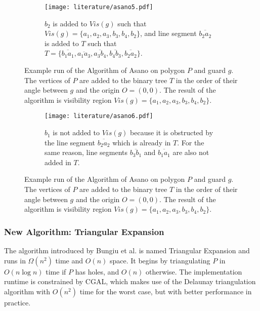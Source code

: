 \begin{figure}[h!]
\begin{subfigure}{0.45\textwidth}
		\texttt{[image: literature/asano5.pdf]}
		\caption{$b_2$ is added to $\mathit{Vis}(g)$ such that \\ $\mathit{Vis}(g) = \{a_1, a_2, a_3, b_3, b_4, b_2\}$, and line segment $\overline{b_2a_2}$ is added to $T$ such that \\ $T = \{\overline{b_1a_1}, \overline{a_1a_3}, \overline{a_3b_4}, \overline{b_4b_3}, \overline{b_2a_2}\}$.}
	\end{subfigure}
	\caption{Example run of the Algorithm of Asano \cite{asano1985efficient} on polygon $P$ and guard $g$. The vertices of $P$ are added to the binary tree $T$ in the order of their angle between $g$ and the origin $O = (0, 0)$. The result of the algorithm is visibility region $\mathit{Vis}(g) = \{a_1, a_2, a_3, b_3, b_4, b_2\}$.}
	\label{fig:asano_1}
\end{figure}
\begin{figure}[h!]
	\ContinuedFloat
	\centering

	\begin{subfigure}{\textwidth}
		\centering
		\texttt{[image: literature/asano6.pdf]}
		\caption{$b_1$ is not added to $\mathit{Vis}(g)$ because it is obstructed by the line segment $\overline{b_2a_2}$ which is already in $T$. For the same reason, line segments $\overline{b_3b_1}$ and $\overline{b_1a_1}$ are also not added in $T$.}
		\label{fig:asano7}
	\end{subfigure}
	\caption{Example run of the Algorithm of Asano \cite{asano1985efficient} on polygon $P$ and guard $g$. The vertices of $P$ are added to the binary tree $T$ in the order of their angle between $g$ and the origin $O = (0, 0)$. The result of the algorithm is visibility region $\mathit{Vis}(g) = \{a_1, a_2, a_3, b_3, b_4, b_2\}$.}
	\label{fig:asano_2}
\end{figure}



\newpage 
\subsubsection{New Algorithm: Triangular Expansion}
The algorithm introduced by Bungiu et al. \cite{DBLP:journals/corr/BungiuHHHK14} is named Triangular Expansion and runs in $\Omega(n^2)$ time and $O(n)$ space. It begins by triangulating $P$ in $O(n \log n)$ time if $P$ has holes, and $O(n)$ otherwise. The implementation runtime is constrained by CGAL, which makes use of the Delaunay triangulation algorithm \cite{delaunay1934sphere} with $O(n^2)$ time for the worst case, but with better performance in practice. 

